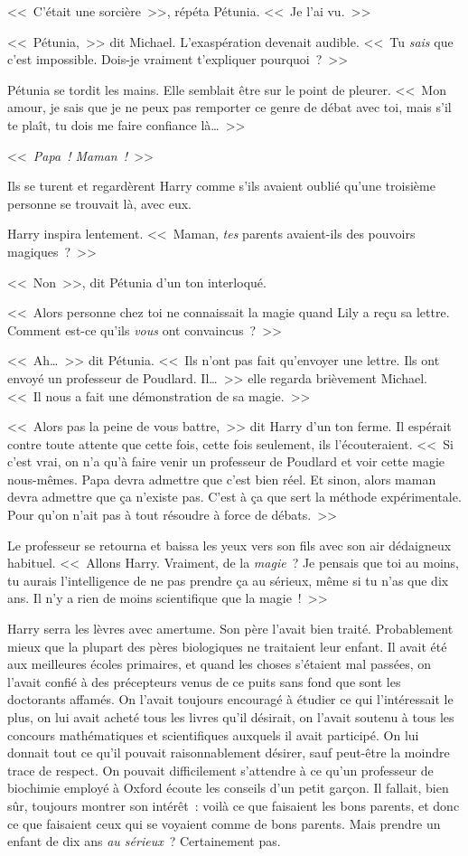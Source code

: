 <<~C'était une sorcière~>>, répéta Pétunia. <<~Je l'ai vu.~>>

<<~Pétunia,~>> dit Michael. L'exaspération devenait audible. <<~Tu \emph{sais} que c'est impossible. Dois-je vraiment t'expliquer pourquoi~?~>>

Pétunia se tordit les mains. Elle semblait être sur le point de pleurer. <<~Mon amour, je sais que je ne peux pas remporter ce genre de débat avec toi, mais s'il te plaît, tu dois me faire confiance là\ldots~>>

<<~\emph{Papa~! Maman~!}~>>

Ils se turent et regardèrent Harry comme s'ils avaient oublié qu'une troisième personne se trouvait là, avec eux.

Harry inspira lentement. <<~Maman, \emph{tes} parents avaient-ils des pouvoirs magiques~?~>>

<<~Non~>>, dit Pétunia d'un ton interloqué.

<<~Alors personne chez toi ne connaissait la magie quand Lily a reçu sa lettre. Comment est-ce qu'ils \emph{vous} ont convaincus~?~>>

<<~Ah\ldots~>> dit Pétunia. <<~Ils n'ont pas fait qu'envoyer une lettre. Ils ont envoyé un professeur de Poudlard. Il\ldots~>> elle regarda brièvement Michael. <<~Il nous a fait une démonstration de sa magie.~>>

<<~Alors pas la peine de vous battre,~>> dit Harry d'un ton ferme. Il espérait contre toute attente que cette fois, cette fois seulement, ils l'écouteraient. <<~Si c'est vrai, on n'a qu'à faire venir un professeur de Poudlard et voir cette magie nous-mêmes. Papa devra admettre que c'est bien réel. Et sinon, alors maman devra admettre que ça n'existe pas. C'est à ça que sert la méthode expérimentale. Pour qu'on n'ait pas à tout résoudre à force de débats.~>>

Le professeur se retourna et baissa les yeux vers son fils avec son air dédaigneux habituel. <<~Allons Harry. Vraiment, de la \emph{magie}~? Je pensais que toi au moins, tu aurais l'intelligence de ne pas prendre ça au sérieux, même si tu n'as que dix ans. Il n'y a rien de moins scientifique que la magie~!~>>

Harry serra les lèvres avec amertume. Son père l'avait bien traité. Probablement mieux que la plupart des pères biologiques ne traitaient leur enfant. Il avait été aux meilleures écoles primaires, et quand les choses s'étaient mal passées, on l'avait confié à des précepteurs venus de ce puits sans fond que sont les doctorants affamés. On l'avait toujours encouragé à étudier ce qui l'intéressait le plus, on lui avait acheté tous les livres qu'il désirait, on l'avait soutenu à tous les concours mathématiques et scientifiques auxquels il avait participé. On lui donnait tout ce qu'il pouvait raisonnablement désirer, sauf peut-être la moindre trace de respect. On pouvait difficilement s'attendre à ce qu'un professeur de biochimie employé à Oxford écoute les conseils d'un petit garçon. Il fallait, bien sûr, toujours montrer son intérêt~: voilà ce que faisaient les bons parents, et donc ce que faisaient ceux qui se voyaient comme de bons parents. Mais prendre un enfant de dix ans \emph{au sérieux}~? Certainement pas.


